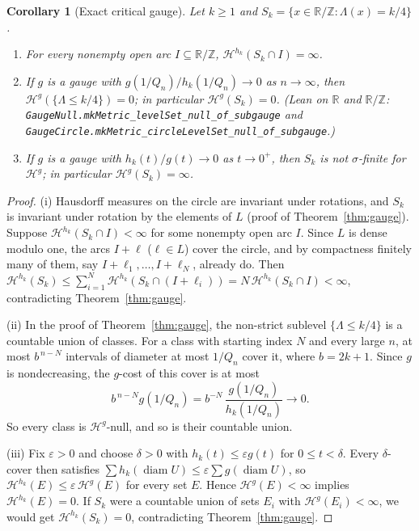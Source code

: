 \documentclass[11pt]{article}
\newtheorem{corollary}[theorem]{Corollary}
\theoremstyle{definition}
\theoremstyle{remark}
\newcommand{\R}{\mathbb{R}}
\newcommand{\Z}{\mathbb{Z}}
\newcommand{\Lam}{\Lambda}
\begin{document}
\begin{corollary}[Exact critical gauge]\label{cor:exact-gauge}
Let $k\ge1$ and $S_k=\{x\in\R/\Z:\Lam(x)=k/4\}$.
\begin{enumerate}[label=(\roman*)]
\item For every nonempty open arc $I\subseteq\R/\Z$,
$\mathcal H^{h_k}(S_k\cap I)=\infty$.
\item If $g$ is a gauge with $g(1/Q_n)/h_k(1/Q_n)\to0$ as $n\to\infty$, then
$\mathcal H^{g}(\{\Lam\le k/4\})=0$; in particular $\mathcal H^g(S_k)=0$.
(Lean on $\R$ and $\R/\Z$: \texttt{GaugeNull.\allowbreak mkMetric\_\allowbreak levelSet\_\allowbreak null\_\allowbreak of\_\allowbreak subgauge} and \texttt{GaugeCircle.\allowbreak mkMetric\_\allowbreak circleLevelSet\_\allowbreak null\_\allowbreak of\_\allowbreak subgauge}.)
\item If $g$ is a gauge with $h_k(t)/g(t)\to0$ as $t\to0^+$, then $S_k$ is
not $\sigma$-finite for $\mathcal H^g$; in particular
$\mathcal H^g(S_k)=\infty$.
\end{enumerate}
\end{corollary}

\begin{proof}
(i) Hausdorff measures on the circle are invariant under rotations, and
$S_k$ is invariant under rotation by the elements of $L$ (proof of
Theorem~\ref{thm:gauge}). Suppose $\mathcal H^{h_k}(S_k\cap I)<\infty$ for
some nonempty open arc $I$. Since $L$ is dense modulo one, the arcs $I+\ell$
($\ell\in L$) cover the circle, and by compactness finitely many of them,
say $I+\ell_1,\ldots,I+\ell_N$, already do. Then
$\mathcal H^{h_k}(S_k)\le\sum_{i=1}^N\mathcal H^{h_k}(S_k\cap(I+\ell_i))
=N\,\mathcal H^{h_k}(S_k\cap I)<\infty$, contradicting
Theorem~\ref{thm:gauge}.

(ii) In the proof of Theorem~\ref{thm:gauge}, the non-strict sublevel
$\{\Lam\le k/4\}$ is a countable union of classes. For a class with
starting index $N$ and every large $n$, at most $b^{\,n-N}$ intervals of
diameter at most $1/Q_n$ cover it, where $b=2k+1$. Since $g$ is
nondecreasing, the $g$-cost of this cover is at most
\[
 b^{\,n-N}g(1/Q_n)=b^{-N}\,\frac{g(1/Q_n)}{h_k(1/Q_n)}\longrightarrow0 .
\]
So every class is $\mathcal H^g$-null, and so is their countable union.

(iii) Fix $\varepsilon>0$ and choose $\delta>0$ with
$h_k(t)\le\varepsilon g(t)$ for $0\le t<\delta$. Every $\delta$-cover then
satisfies $\sum h_k(\operatorname{diam}U)\le
\varepsilon\sum g(\operatorname{diam}U)$, so
$\mathcal H^{h_k}(E)\le\varepsilon\,\mathcal H^g(E)$ for every set $E$.
Hence $\mathcal H^g(E)<\infty$ implies $\mathcal H^{h_k}(E)=0$. If $S_k$
were a countable union of sets $E_i$ with $\mathcal H^g(E_i)<\infty$, we
would get $\mathcal H^{h_k}(S_k)=0$, contradicting Theorem~\ref{thm:gauge}.
\end{proof}
\end{document}

